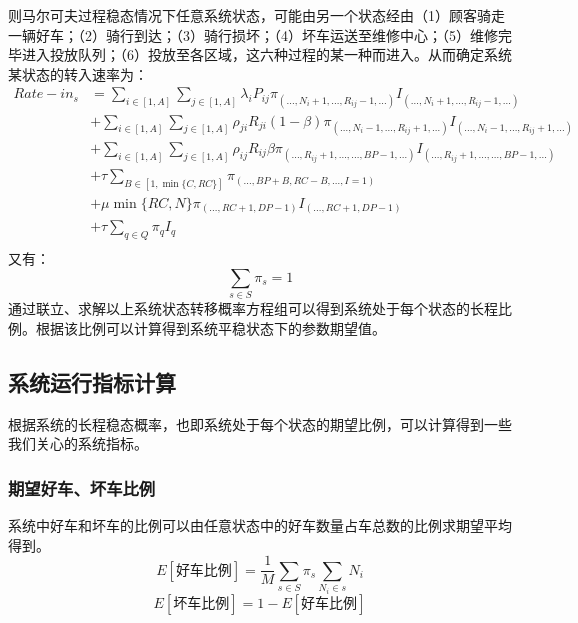 \documentclass{article}
\begin{document}
则马尔可夫过程稳态情况下任意系统状态，可能由另一个状态经由（1）顾客骑走一辆好车；（2）骑行到达；（3）骑行损坏；（4）坏车运送至维修中心；（5）维修完毕进入投放队列；（6）投放至各区域，这六种过程的某一种而进入。从而确定系统某状态的转入速率为：
\begin{equation}
    \begin{aligned}
        Rate-in_{s} &= 
        \sum \limits _{i \in [1,A]} \sum \limits _{j \in [1,A]} \lambda_i P_{ij} \pi_{(\dots, N_i+1, \dots ,R_{ij}-1,\dots)} I_{(\dots, N_i+1, \dots ,R_{ij}-1,\dots)}\\
        &+\sum \limits _{i \in [1,A]} \sum \limits _{j \in [1,A]} \rho_{ji} R_{ji} (1-\beta) \pi_{(\dots, N_i-1, \dots ,R_{ij}+1,\dots)} I_{(\dots, N_i-1, \dots ,R_{ij}+1,\dots)}\\
        &+\sum \limits _{i \in [1,A]} \sum \limits _{j \in [1,A]} \rho_{ij} R_{ij} \beta \pi_{(\dots ,R_{ij}+1, \dots, \dots, BP-1, \dots)} I_{(\dots ,R_{ij}+1, \dots, \dots, BP-1, \dots)}\\
        &+\tau \sum \limits _{B \in [1,\min\{C, RC\}] } \pi_{(\dots, BP+B, RC-B, \dots, I=1)} \\
        &+\mu \min \{RC, N\} \pi_{(\dots, RC+1, DP-1)} I_{(\dots, RC+1, DP-1)}\\
        &+\tau \sum \limits _{q \in Q}\pi_{q} I_{q}\\
    \end{aligned}
\end{equation}
又有：
\begin{equation}
    \sum \limits _{s \in S} \pi_{s} = 1
\end{equation}
通过联立、求解以上系统状态转移概率方程组可以得到系统处于每个状态的长程比例。根据该比例可以计算得到系统平稳状态下的参数期望值。

\subsection{系统运行指标计算}
根据系统的长程稳态概率，也即系统处于每个状态的期望比例，可以计算得到一些我们关心的系统指标。
\subsubsection{期望好车、坏车比例}
系统中好车和坏车的比例可以由任意状态中的好车数量占车总数的比例求期望平均得到。
\begin{equation}
    E[\mbox{好车比例}] = \frac{1}{M} \sum \limits _{s \in S} \pi_{s} \sum \limits _{N_i \in s} N_i 
\end{equation}
\begin{equation}
    E[\mbox{坏车比例}] = 1 - E[\mbox{好车比例}]
\end{equation}
\end{document}
